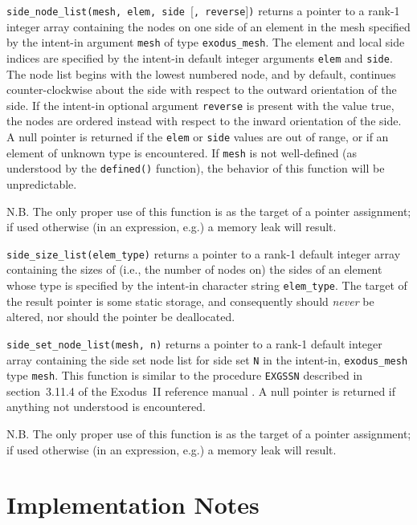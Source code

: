 \documentclass[oneside,12pt]{amsart}
\newenvironment{mydesc}%
  {\begin{list}{}{%
    \setlength{\labelsep}{0pt}%
    \setlength{\itemindent}{-\leftmargin}%
    \setlength{\itemsep}{\parskip}%
    \setlength{\listparindent}{0pt}\setlength{\parsep}{\parskip}}}
  {\end{list}}
\begin{document}
\begin{mydesc}
\item \texttt{side_node_list(mesh, elem, side }[\texttt{, reverse}]\texttt{)}
  returns a pointer to a rank-1 integer array containing the nodes on one side
  of an element in the mesh specified by the intent-in argument \texttt{mesh}
  of type \texttt{exodus_mesh}.  The element and local side indices are
  specified by the intent-in default integer arguments \texttt{elem} and
  \texttt{side}.  The node list begins with the lowest numbered node, and
  by default, continues counter-clockwise about the side with respect to the
  outward orientation of the side.  If the intent-in optional argument
  \texttt{reverse} is present with the value true, the nodes are ordered
  instead with respect to the inward orientation of the side.  A null pointer
  is returned if the \texttt{elem} or \texttt{side} values are out of range,
  or if an element of unknown type is encountered.  If \texttt{mesh} is not
  well-defined (as understood by the \texttt{defined()} function), the behavior
  of this function will be unpredictable.\par
  N.B. The only proper use of this function is as the target of a pointer
  assignment; if used otherwise (in an expression, e.g.) a memory leak will
  result.
\item \texttt{side_size_list(elem_type)} returns a pointer to a rank-1 default
  integer array containing the sizes of (i.e., the number of nodes on) the
  sides of an element whose type is specified by the intent-in character string
  \texttt{elem_type}.  The target of the result pointer is some static
  storage, and consequently should \emph{never} be altered, nor should the
  pointer be deallocated.
\item \texttt{side_set_node_list(mesh, n)} returns a pointer to a rank-1
  default integer array containing the side set node list for side set
  \texttt{N} in the intent-in, \texttt{exodus_mesh} type \texttt{mesh}.
  This function is similar to the procedure \texttt{EXGSSN} described in
  section~3.11.4 of the Exodus~II reference manual \cite{exodusII}.
  A null pointer is returned if anything not understood is encountered.\par
  N.B. The only proper use of this function is as the target of a pointer
  assignment; if used otherwise (in an expression, e.g.) a memory leak will
  result.
\end{mydesc} 

\section{Implementation Notes}
\end{document}
